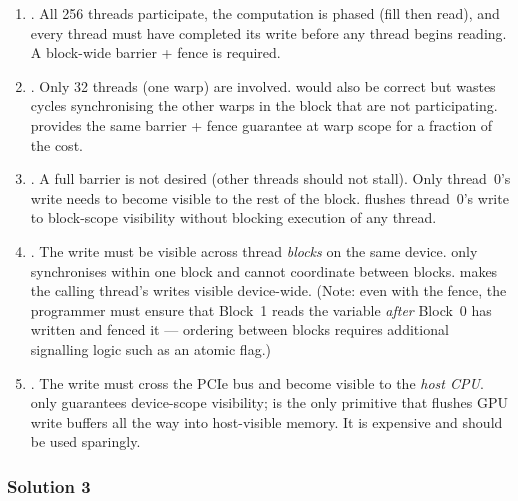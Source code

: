 \begin{enumerate}[label=(\alph*)]
  \item {}.  All 256 threads participate, the computation
        is phased (fill then read), and every thread must have completed its write
        before any thread begins reading.  A block-wide barrier + fence is required.

  \item {}.  Only 32 threads (one warp) are involved.
         would also be correct but wastes cycles
        synchronising the other warps in the block that are not participating.
         provides the same barrier + fence guarantee at
        warp scope for a fraction of the cost.

  \item {}.  A full barrier is not desired
        (other threads should not stall).  Only thread~0's write needs to become
        visible to the rest of the block.  
        flushes thread~0's write to block-scope visibility without blocking
        execution of any thread.

  \item {}.  The write must be visible across thread
        \emph{blocks} on the same device.   only
        synchronises within one block and cannot coordinate between blocks.
         makes the calling thread's writes visible
        device-wide.  (Note: even with the fence, the programmer must ensure
        that Block~1 reads the variable \emph{after} Block~0 has written and
        fenced it --- ordering between blocks requires additional signalling
        logic such as an atomic flag.)

  \item {}.  The write must cross the PCIe bus
        and become visible to the \emph{host CPU}.
         only guarantees device-scope visibility;
         is the only primitive that flushes
        GPU write buffers all the way into host-visible memory.  It is expensive
        and should be used sparingly.
\end{enumerate}

\subsubsection{Solution 3}


